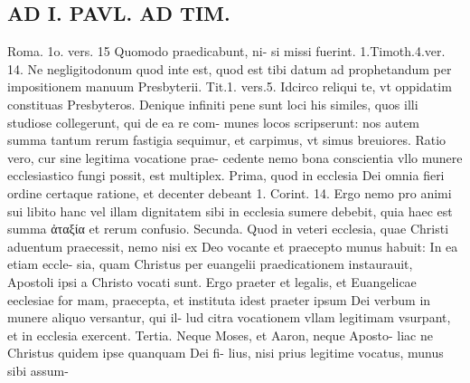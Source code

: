 \documentclass{article}
\begin{document}
\begin{pages}
\section*{AD I. PAVL. AD TIM. }
\marginpar{[ p.46 ]}\pstart Roma. 1o. vers. 15 Quomodo praedicabunt, ni- si missi fuerint. 1.Timoth.4.ver. 14. Ne negligitodonum quod inte est, quod est tibi datum ad prophetandum per impositionem manuum Presbyterii. Tit.1. vers.5. Idcirco reliqui te, vt oppidatim constituas Presbyteros. Denique infiniti pene sunt loci his similes, quos illi studiose collegerunt, qui de ea re com- munes locos scripserunt: nos autem summa tantum rerum fastigia sequimur, et carpimus, vt simus breuiores. Ratio vero, cur sine legitima vocatione prae- cedente nemo bona conscientia vllo munere ecclesiastico fungi possit, est multiplex. Prima, quod in ecclesia Dei omnia fieri ordine certaque ratione, et decenter debeant 1. Corint. 14. Ergo nemo pro animi sui libito hanc vel illam dignitatem sibi in ecclesia sumere debebit, quia haec est summa ἀταξία et rerum confusio. Secunda. Quod in veteri ecclesia, quae Christi aduentum praecessit, nemo nisi ex Deo vocante et praecepto munus habuit: In ea etiam eccle- sia, quam Christus per euangelii praedicationem instaurauit, Apostoli ipsi a Christo vocati sunt. Ergo praeter et legalis, et Euangelicae eeclesiae for mam, praecepta, et instituta idest praeter ipsum Dei verbum in munere aliquo versantur, qui il- lud citra vocationem vllam legitimam vsurpant, et in ecclesia exercent. Tertia. Neque Moses, et Aaron, neque Aposto- liac ne Christus quidem ipse quanquam Dei fi- lius, nisi prius legitime vocatus, munus sibi assum-  \pend

\end{pages}
\end{document}
